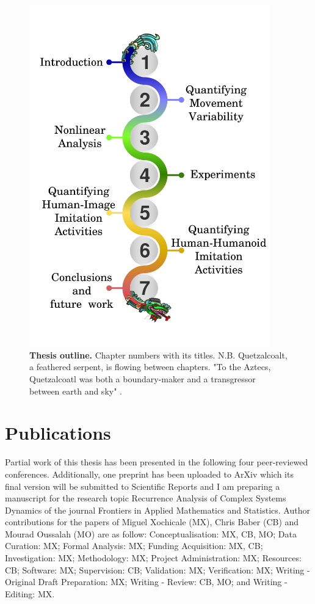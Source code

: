 \begin{figure}
\centering
\includegraphics[width=0.93\textwidth]{toutline}
    \caption[Thesis outline]{
	{\bf Thesis outline.}
	Chapter numbers with its titles. 
	N.B. Quetzalcoalt, a feathered serpent, is flowing between chapters.
	"To the Aztecs, Quetzalcoatl 
	was both a boundary-maker and a transgressor 
	between earth and sky" \citep{wiki:quetzalcoatl}. 
	}
    \label{fig:thesis-outline}
\end{figure}

\section{Publications}
Partial work of this thesis has been presented in the following four 
peer-reviewed conferences. Additionally, one preprint has been 
uploaded to ArXiv which its final version will be submitted 
to Scientific Reports and I am preparing a manuscript for the 
research topic Recurrence Analysis of Complex Systems Dynamics
of the journal Frontiers in Applied Mathematics and Statistics.
Author contributions for the papers of 
Miguel Xochicale (MX), Chris Baber (CB) and Mourad Oussalah (MO) are as follow:
Conceptualisation: MX, CB, MO;
Data Curation: MX;
Formal Analysis: MX;
Funding Acquisition: MX, CB;
Investigation: MX;
Methodology: MX;
Project Administration: MX;
Resources: CB;
Software: MX;
Supervision: CB;
Validation: MX;
Verification: MX;
Writing - Original Draft Preparation: MX;
Writing - Review: CB, MO; and 
Writing - Editing: MX.

